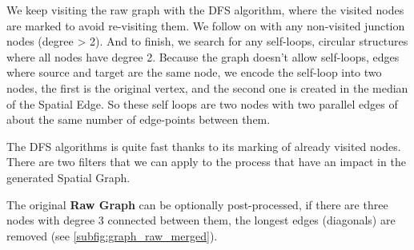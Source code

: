 We keep visiting the raw graph with the \gls{DFS} algorithm, where the visited nodes are marked to avoid re-visiting them. We follow on with any non-visited junction nodes (degree > 2). And to finish, we search for any self-loops, circular structures where all nodes have degree 2. Because the graph doesn't allow self-loops, edges where source and target are the same node, we encode the self-loop into two nodes, the first is the original vertex, and the second one is created in the median of the \gls{Spatial Edge}. So these self loops are two nodes with two parallel edges of about the same number of edge-points between them.

The \gls{DFS} algorithms is quite fast thanks to its marking of already visited nodes. There are two filters that we can apply to the process that have an impact in the generated \gls{Spatial Graph}.

The original \textbf{Raw Graph} can be optionally post-processed, if there are three nodes with degree 3 connected between them, the longest edges (diagonals) are removed (see \autoref{subfig:graph_raw_merged}).


